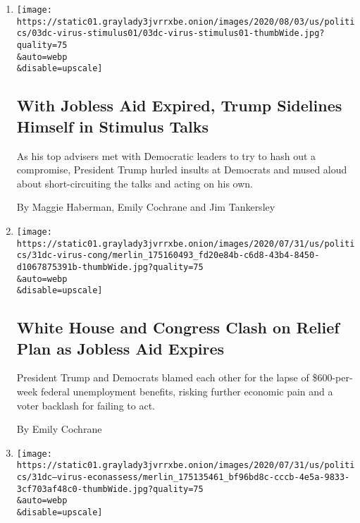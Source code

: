 \begin{enumerate}
\def\labelenumi{\arabic{enumi}.}
\item
  \href{/2020/08/03/us/politics/congress-jobless-aid-talks-trump.html}{}

  \texttt{[image: https://static01.graylady3jvrrxbe.onion/images/2020/08/03/us/politics/03dc-virus-stimulus01/03dc-virus-stimulus01-thumbWide.jpg?quality=75\\\&auto=webp\\\&disable=upscale]}

  \hypertarget{with-jobless-aid-expired-trump-sidelines-himself-in-stimulus-talks}{%
  \subsection{With Jobless Aid Expired, Trump Sidelines Himself in
  Stimulus
  Talks}\label{with-jobless-aid-expired-trump-sidelines-himself-in-stimulus-talks}}

  As his top advisers met with Democratic leaders to try to hash out a
  compromise, President Trump hurled insults at Democrats and mused
  aloud about short-circuiting the talks and acting on his own.

  By Maggie Haberman, Emily Cochrane and Jim Tankersley
\item
  \href{/2020/07/31/us/politics/white-house-congress-relief-plan-jobless-aid.html}{}

  \texttt{[image: https://static01.graylady3jvrrxbe.onion/images/2020/07/31/us/politics/31dc-virus-cong/merlin\_175160493\_fd20e84b-c6d8-43b4-8450-d1067875391b-thumbWide.jpg?quality=75\\\&auto=webp\\\&disable=upscale]}

  \hypertarget{white-house-and-congress-clash-on-relief-plan-as-jobless-aid-expires}{%
  \subsection{White House and Congress Clash on Relief Plan as Jobless
  Aid
  Expires}\label{white-house-and-congress-clash-on-relief-plan-as-jobless-aid-expires}}

  President Trump and Democrats blamed each other for the lapse of
  \$600-per-week federal unemployment benefits, risking further economic
  pain and a voter backlash for failing to act.

  By Emily Cochrane
\item
  \href{/2020/07/31/business/coronavirus-trump-economy.html}{}

  \texttt{[image: https://static01.graylady3jvrrxbe.onion/images/2020/07/31/us/politics/31dc--virus-econassess/merlin\_175135461\_bf96bd8c-cccb-4e5a-9833-3cf703af48c0-thumbWide.jpg?quality=75\\\&auto=webp\\\&disable=upscale]}


\end{enumerate}
